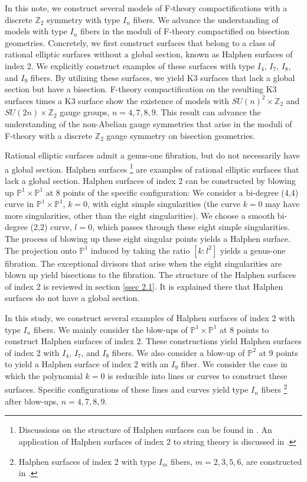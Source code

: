 \documentclass[12pt]{article}
\def\Z{\mathbb{Z}}
\def\P{\mathbb{P}}
\begin{document}
\par In this note, we construct several models of F-theory compactifications with a discrete $\Z_2$ symmetry with type $I_n$ fibers. We advance the understanding of models with type $I_n$ fibers in the moduli of F-theory compactified on bisection geometries. Concretely, we first construct surfaces that belong to a class of rational elliptic surfaces without a global section, known as Halphen surfaces of index 2. We explicitly construct examples of these surfaces with type $I_4$, $I_7$, $I_8$, and $I_9$ fibers. By utilizing these surfaces, we yield K3 surfaces that lack a global section but have a bisection. F-theory compactification on the resulting K3 surfaces times a K3 surface show the existence of models with $SU(n)^2 \times \Z_2$ and $SU(2n) \times \Z_2$ gauge groups, $n=4,7,8,9$. This result can advance the understanding of the non-Abelian gauge symmetries that arise in the moduli of F-theory with a discrete $\Z_2$ gauge symmetry on bisection geometries. 
\par Rational elliptic surfaces admit a genus-one fibration, but do not necessarily have a global section. Halphen surfaces \footnote{Discussions on the structure of Halphen surfaces can be found in \cite{DolgachevZhang, CantatDolgachev}. An application of Halphen surfaces of index 2 to string theory is discussed in \cite{Kimura1801}.} are examples of rational elliptic surfaces that lack a global section. Halphen surfaces of index 2 can be constructed by blowing up $\P^1\times\P^1$ at 8 points of the specific configuration: We consider a bi-degree (4,4) curve in $\P^1\times\P^1$, $k=0$, with eight simple singularities (the curve $k=0$ may have more singularities, other than the eight singularities). We choose a smooth bi-degree (2,2) curve, $l=0$, which passes through these eight simple singularities. The process of blowing up these eight singular points yields a Halphen surface. The projection onto $\P^1$ induced by taking the ratio $[k:l^2]$ yields a genus-one fibration. The exceptional divisors that arise when the eight singularities are blown up yield bisections to the fibration. The structure of the Halphen surfaces of index 2 is reviewed in section \ref{ssec 2.1}. It is explained there that Halphen surfaces do not have a global section.
\par In this study, we construct several examples of Halphen surfaces of index 2 with type $I_n$ fibers. We mainly consider the blow-ups of $\P^1\times\P^1$ at 8 points to construct Halphen surfaces of index 2. These constructions yield Halphen surfaces of index 2 with $I_4$, $I_7$, and $I_8$ fibers. We also consider a blow-up of $\P^2$ at 9 points to yield a Halphen surface of index 2 with an $I_9$ fiber. We consider the case in which the polynomial $k=0$ is reducible into lines or curves to construct these surfaces. Specific configurations of these lines and curves yield type $I_n$ fibers \footnote{Halphen surfaces of index 2 with type $I_m$ fibers, $m=2,3,5,6$, are constructed in \cite{Kimura1801}.} after blow-ups, $n=4,7,8,9$. 
\end{document}
